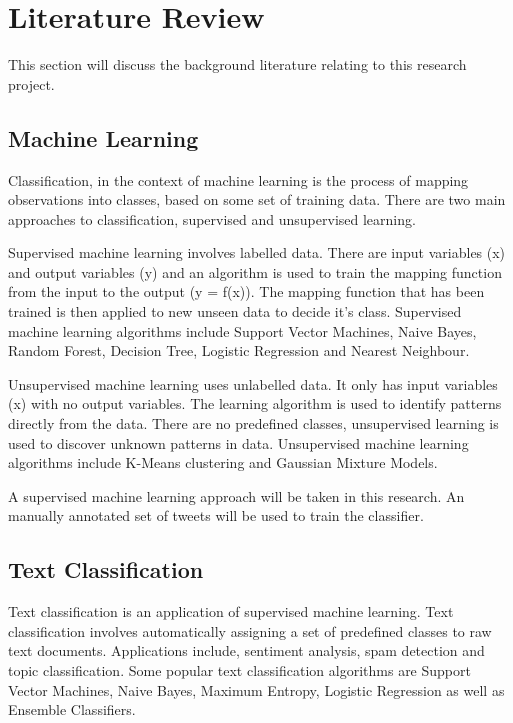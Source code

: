 \chapter{Literature Review}

This section will discuss the background literature relating to this research project.

\section{Machine Learning}

Classification, in the context of machine learning is the process of mapping observations into classes, based on some set of training data. There are two main approaches to classification, supervised and unsupervised learning. 

Supervised machine learning involves labelled data. There are input variables (x) and output variables (y) and an algorithm is used to train the mapping function from the input to the output (y = f(x)). The mapping function that has been trained is then applied to new unseen data to decide it's class. Supervised machine learning algorithms include Support Vector Machines, Naive Bayes, Random Forest, Decision Tree, Logistic Regression and Nearest Neighbour.

Unsupervised machine learning uses unlabelled data. It only has input variables (x) with no output variables. The learning algorithm is used to identify patterns directly from the data. There are no predefined classes, unsupervised learning is used to discover unknown patterns in data. Unsupervised machine learning algorithms include K-Means clustering and Gaussian Mixture Models. 

A supervised machine learning \cite{supervised2007} approach will be taken in this research. An manually annotated set of tweets will be used to train the classifier.

\section{Text Classification}

Text classification is an application of supervised machine learning. Text classification involves automatically assigning a set of predefined classes to raw text documents. Applications include, sentiment analysis, spam detection and topic classification. Some popular text classification algorithms are Support Vector Machines, Naive Bayes, Maximum Entropy, Logistic Regression as well as Ensemble Classifiers.

